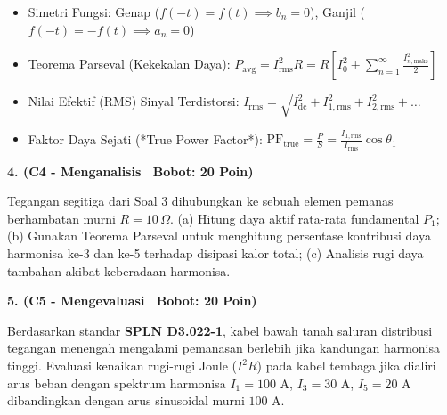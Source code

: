 \documentclass[10pt,a4paper]{article}
\begin{document}
\vfill

\begin{tcolorbox}[colback=unibblue!3,colframe=unibblue,colbacktitle=unibblue,coltitle=white,boxrule=0.6pt,arc=2pt,left=6pt,right=6pt,top=3pt,bottom=3pt,title=\textbf{\scriptsize FORMULA RUJUKAN TEKNIS \& STANDAR INDUSTRI TERKAIT}]
  \scriptsize
  \begin{itemize}[leftmargin=*, nosep]
  \item Simetri Fungsi: Genap ($f(-t) = f(t) \implies b_n = 0$), Ganjil ($f(-t) = -f(t) \implies a_n = 0$)
  \item Teorema Parseval (Kekekalan Daya): $P_{\text{avg}} = I_{\text{rms}}^2 R = R \left[ I_0^2 + \sum_{n=1}^\infty \frac{I_{n,\text{maks}}^2}{2} \right]$
  \item Nilai Efektif (RMS) Sinyal Terdistorsi: $I_{\text{rms}} = \sqrt{I_{\text{dc}}^2 + I_{1,\text{rms}}^2 + I_{2,\text{rms}}^2 + \dots}$
  \item Faktor Daya Sejati (*True Power Factor*): $\text{PF}_{\text{true}} = \frac{P}{S} = \frac{I_{1,\text{rms}}}{I_{\text{rms}}} \cos\theta_1$
\end{itemize}
\end{tcolorbox}

\newpage

\par
\vspace{1mm}

\noindent\textbf{4. (C4 - Menganalisis \textbar\ Bobot: 20 Poin)}\par\vspace{0.8mm}
{\footnotesize Tegangan segitiga dari Soal 3 dihubungkan ke sebuah elemen pemanas berhambatan murni $R = 10\,\Omega$. (a) Hitung daya aktif rata-rata fundamental $P_1$; (b) Gunakan Teorema Parseval untuk menghitung persentase kontribusi daya harmonisa ke-3 dan ke-5 terhadap disipasi kalor total; (c) Analisis rugi daya tambahan akibat keberadaan harmonisa.}\par

\vspace{3.5mm}

\noindent\textbf{5. (C5 - Mengevaluasi \textbar\ Bobot: 20 Poin)}\par\vspace{0.8mm}
{\footnotesize Berdasarkan standar \textbf{SPLN D3.022-1}, kabel bawah tanah saluran distribusi tegangan menengah mengalami pemanasan berlebih jika kandungan harmonisa tinggi. Evaluasi kenaikan rugi-rugi Joule ($I^2 R$) pada kabel tembaga jika dialiri arus beban dengan spektrum harmonisa $I_1 = 100\text{ A}$, $I_3 = 30\text{ A}$, $I_5 = 20\text{ A}$ dibandingkan dengan arus sinusoidal murni $100\text{ A}$.}\par
\end{document}
